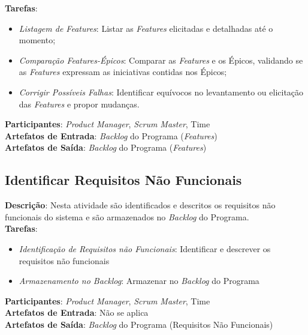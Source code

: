   \textbf{Tarefas}:
  \begin{itemize}
   \item \indent \textit{Listagem de \textit{Features}}: Listar as \textit{Features} elicitadas e detalhadas até o momento;

   \item \indent \textit{Comparação \textit{Features}-Épicos}: Comparar as \textit{Features} e os Épicos, validando se as \textit{Features} expressam as iniciativas contidas nos Épicos;

   \item \indent \textit{Corrigir Possíveis Falhas}: Identificar equívocos no levantamento ou elicitação das \textit{Features} e propor mudanças.
  \end{itemize}

  \textbf{Participantes}: \textit{Product Manager}, \textit{Scrum Master}, Time \\

  \textbf{Artefatos de Entrada}: \textit{Backlog} do Programa (\textit{Features})\\

  \textbf{Artefatos de Saída}:   \textit{Backlog} do Programa (\textit{Features})\\

\subsection{Identificar Requisitos Não Funcionais}
  \textbf{Descrição}: Nesta atividade são identificados e descritos os requisitos não funcionais do sistema e são armazenados no \textit{Backlog} do Programa.  \\

  \textbf{Tarefas}:
  \begin{itemize}
   \item \indent \textit{Identificação de Requisitos não Funcionais}: Identificar e descrever os requisitos não funcionais

   \item \indent \textit{Armazenamento no \textit{Backlog}}: Armazenar no \textit{Backlog} do Programa
  \end{itemize}

  \textbf{Participantes}: \textit{Product Manager}, \textit{Scrum Master}, Time \\

  \textbf{Artefatos de Entrada}:  Não se aplica\\

  \textbf{Artefatos de Saída}:  \textit{Backlog} do Programa (Requisitos Não Funcionais)\\

